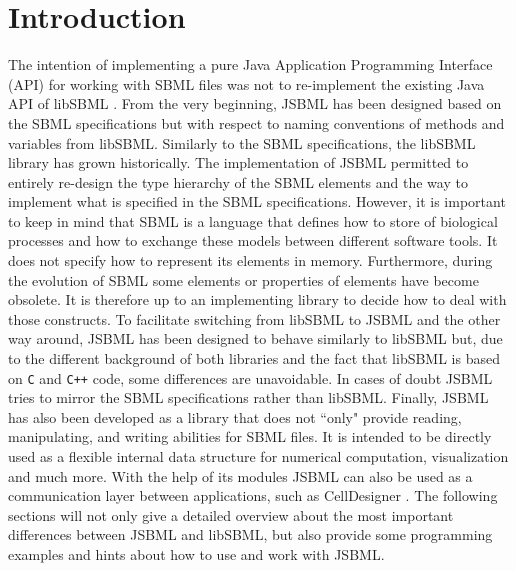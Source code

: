 \section{Introduction}

The intention of implementing a pure Java\texttrademark{}
Application Programming Interface (API) for working with SBML files was not to
re-implement the existing Java API of libSBML
%
\citep{Bornstein2008}.
From the very beginning, JSBML
%
has been designed based on the SBML specifications \citep{Hucka2003, Hucka2008,
Hucka2010a} but with respect to naming conventions of methods and variables from
libSBML. Similarly to the SBML specifications,
%
the libSBML library has grown historically. The implementation of JSBML
permitted to entirely re-design the type hierarchy of the SBML elements and the
way to implement what is specified in the SBML specifications. However, it is
important to keep in mind that SBML is a language that defines how to store of
biological processes and how to exchange these models between
%
different software tools. It
does not specify how to represent its elements in memory. Furthermore, during
the evolution of SBML some elements or properties of elements have become
obsolete.
%
It is therefore up to an implementing library to
decide how to deal with those constructs. To facilitate switching from libSBML
to JSBML and the other way around, JSBML has been designed to behave similarly
to libSBML but, due to the different background of both libraries and the fact
that libSBML is based on \texttt{C}
%
and \texttt{C++}
%
code, some differences are unavoidable. In cases of doubt JSBML tries to mirror
the SBML specifications rather than libSBML. Finally, JSBML has also been
developed as a library that does not ``only" provide reading, manipulating, and
writing abilities for SBML files. It is intended to be directly used as a
flexible internal data structure for numerical computation, visualization and
much more. With the help of its modules JSBML can also be used as a
communication layer between applications, such as CellDesigner
\citep{Funahashi2003}. The following sections will not only give a detailed
overview about the most important differences between JSBML and libSBML, but
also provide some programming examples and hints about how to use and work with
JSBML.


